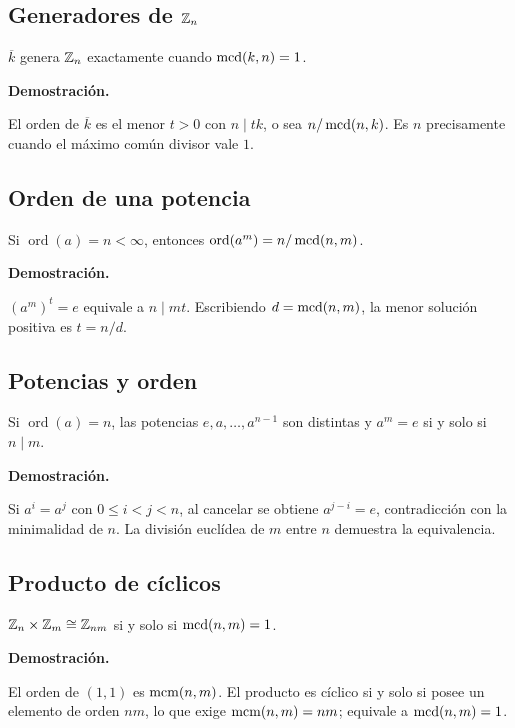 \documentclass[11pt,a4paper]{article}
\newcommand{\ord}{\operatorname{ord}}\newcommand{\gen}[1]{\langle #1\rangle}
\begin{document}
\subsection{Generadores de $\mathbb{Z}_n$}
\begin{resultado}
$\overline k$ genera $\mathbb{Z}_n$ exactamente cuando $\operatorname{mcd}(k,n)=1$.
\end{resultado}
\textbf{Demostración.}
\begin{demostracion}
El orden de $\overline k$ es el menor $t>0$ con $n\mid tk$, o sea $n/\operatorname{mcd}(n,k)$. Es $n$ precisamente cuando el máximo común divisor vale $1$.
\end{demostracion}


\subsection{Orden de una potencia}
\begin{resultado}
Si $\ord(a)=n<\infty$, entonces $\ord(a^m)=n/\mcd(n,m)$.
\end{resultado}
\textbf{Demostración.}
\begin{demostracion}
$(a^m)^t=e$ equivale a $n\mid mt$. Escribiendo $d=\operatorname{mcd}(n,m)$, la menor solución positiva es $t=n/d$.
\end{demostracion}


\subsection{Potencias y orden}
\begin{resultado}
Si $\ord(a)=n$, las potencias $e,a,\ldots,a^{n-1}$ son distintas y $a^m=e$ si y solo si $n\mid m$.
\end{resultado}
\textbf{Demostración.}
\begin{demostracion}
Si $a^i=a^j$ con $0\le i<j<n$, al cancelar se obtiene $a^{j-i}=e$, contradicción con la minimalidad de $n$. La división euclídea de $m$ entre $n$ demuestra la equivalencia.
\end{demostracion}


\subsection{Producto de cíclicos}
\begin{resultado}
$\mathbb{Z}_n\times\mathbb{Z}_m\cong\mathbb{Z}_{nm}$ si y solo si $\operatorname{mcd}(n,m)=1$.
\end{resultado}
\textbf{Demostración.}
\begin{demostracion}
El orden de $(1,1)$ es $\operatorname{mcm}(n,m)$. El producto es cíclico si y solo si posee un elemento de orden $nm$, lo que exige $\operatorname{mcm}(n,m)=nm$; equivale a $\operatorname{mcd}(n,m)=1$.
\end{demostracion}
\end{document}
